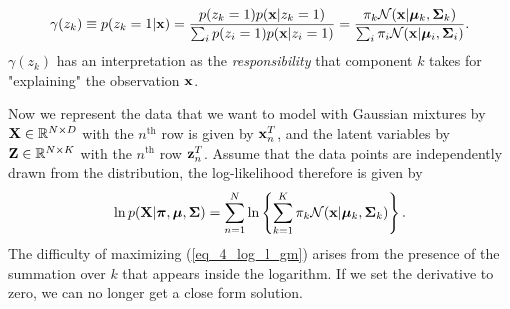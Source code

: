 \documentclass[../book-template.tex]{subfiles}
\begin{document}
\begin{align*}
	\gamma(z_k) \equiv p(z_k=1|{\bf x})= \frac{p(z_k=1)p({\bf x}|z_k=1)}{\sum_i p(z_i=1)p({\bf x}|z_i=1)}= \frac{\pi_k \mathcal{N}({\bf x}|\bm{\mu}_k, {\bf\Sigma}_k)}{\sum_{i} \pi_i \mathcal{N}({\bf x}|\bm{\mu}_i, {\bf\Sigma}_i)}.
\end{align*}
$\gamma(z_k)$ has an interpretation as the \emph{responsibility} that component $k$ takes for "explaining" the observation ${\bf x}$. 
\par Now we represent the data that we want to model with Gaussian mixtures by ${\bf X}\in \mathbb{R}^{N\times D}$ with the $n^{\text{th}}$ row is given by ${\bf x}_n^T$, and the latent variables by ${\bf Z}\in \mathbb{R}^{N\times K}$ with the $n^{\text{th}}$ row ${\bf z}_n^T$. Assume that the data points are independently drawn from the distribution, the log-likelihood therefore is given by
\begin{equation}\label{eq_4_log_l_gm}
	\ln p({\bf X}|\bm{\pi},\bm{\mu},{\bf \Sigma}) = \sum_{n=1}^{N}\ln \left\{\sum_{k=1}^{K} \pi_k \mathcal{N}({\bf x}|\bm{\mu}_k, {\bf\Sigma}_k)\right\}.
\end{equation}
The difficulty of maximizing (\ref{eq_4_log_l_gm}) arises from the presence of the summation over $k$ that appears inside the logarithm. If we set the derivative to zero, we can no longer get a close form solution.
\end{document}
